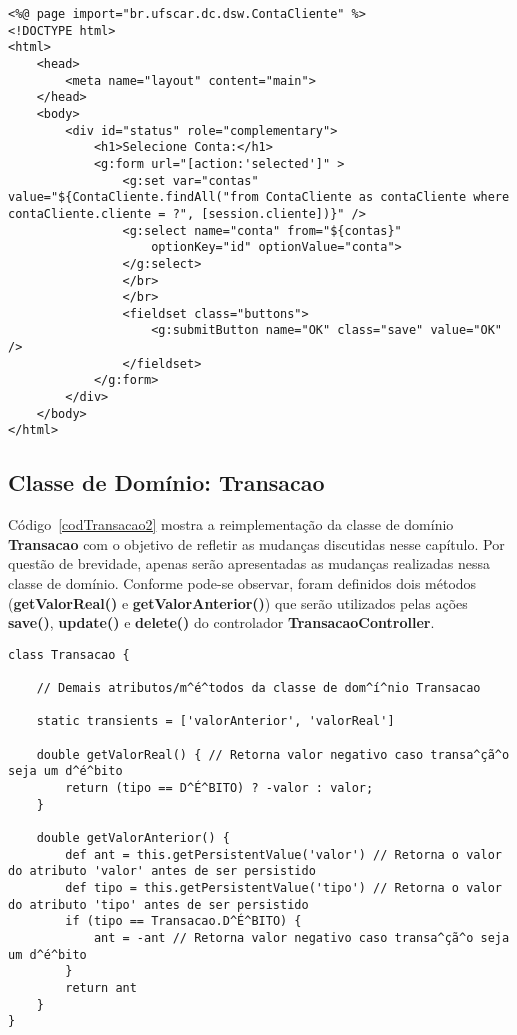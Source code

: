 \begin{lstlisting}[caption=Visão   {\bf  selecionaConta/index.gsp},  frame=trBL,
    float=htbp, label=codSelecionaContaIndex] 
<%@ page import="br.ufscar.dc.dsw.ContaCliente" %>
<!DOCTYPE html>
<html>
    <head>
        <meta name="layout" content="main">
    </head>
    <body>
        <div id="status" role="complementary">
            <h1>Selecione Conta:</h1>
            <g:form url="[action:'selected']" >
                <g:set var="contas" value="${ContaCliente.findAll("from ContaCliente as contaCliente where contaCliente.cliente = ?", [session.cliente])}" />
                <g:select name="conta" from="${contas}" 
                    optionKey="id" optionValue="conta">
                </g:select>
                </br>
                </br>
                <fieldset class="buttons">
                    <g:submitButton name="OK" class="save" value="OK" />
                </fieldset>
            </g:form>
        </div>
    </body>
</html>
\end{lstlisting}

\subsection{Classe de Domínio: Transacao}

\vspace{0.5cm}

Código~\ref{codTransacao2} mostra  a reimplementação  da classe de  domínio {\bf
  Transacao} com o  objetivo de refletir as mudanças  discutidas nesse capítulo.
Por questão de brevidade, apenas serão apresentadas as mudanças realizadas nessa
classe  de domínio.   Conforme pode-se  observar, foram  definidos  dois métodos
({\bf  getValorReal()} e  {\bf getValorAnterior()})  que serão  utilizados pelas
ações  {\bf  save()},  {\bf  update()}  e {\bf  delete()}  do  controlador  {\bf
  TransacaoController}.  

\begin{lstlisting}[caption=Classe  de  domínio {\bf  Transacao},  frame =  trBL,
    float=htbp, label=codTransacao2] 
class Transacao {
    
    // Demais atributos/m^é^todos da classe de dom^í^nio Transacao

    static transients = ['valorAnterior', 'valorReal']
    
    double getValorReal() { // Retorna valor negativo caso transa^çã^o seja um d^é^bito
        return (tipo == D^É^BITO) ? -valor : valor;
    }
    
    double getValorAnterior() {
        def ant = this.getPersistentValue('valor') // Retorna o valor do atributo 'valor' antes de ser persistido
        def tipo = this.getPersistentValue('tipo') // Retorna o valor do atributo 'tipo' antes de ser persistido
        if (tipo == Transacao.D^É^BITO) {
            ant = -ant // Retorna valor negativo caso transa^çã^o seja um d^é^bito
        }
        return ant
    } 
}
\end{lstlisting}

